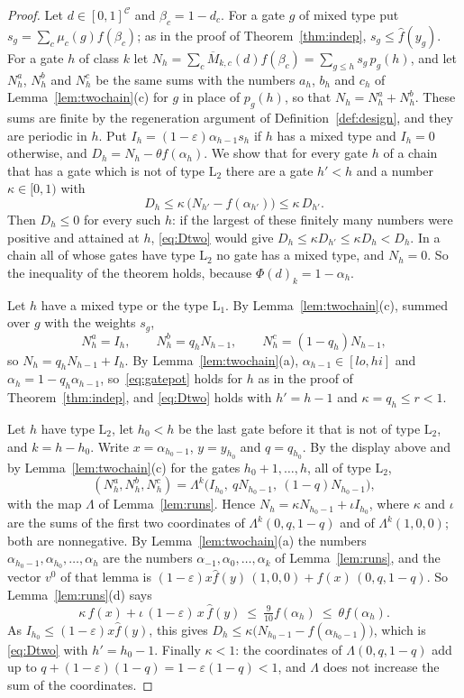 \documentclass[11pt]{amsart}
\theoremstyle{definition}
\theoremstyle{remark}
\newcommand{\eps}{\varepsilon}
\begin{document}
\begin{proof}
Let $d\in[0,1]^{\mathcal C}$ and $\beta_c=1-d_c$. For a gate $g$ of mixed type put
$s_g=\sum_c\mu_c(g)f(\beta_c)$; as in the proof of Theorem~\ref{thm:indep},
$s_g\le\hat f(y_g)$. For a gate $h$ of class $k$ let
$N_h=\sum_c\overline M_{k,c}(d)f(\beta_c)=\sum_{g\le h}s_g\,p_g(h)$, and let $N^a_h$, $N^b_h$
and $N^c_h$ be the same sums with the numbers $a_h$, $b_h$ and $c_h$ of
Lemma~\ref{lem:twochain}(c) for $g$ in place of $p_g(h)$, so that $N_h=N^a_h+N^b_h$. These sums
are finite by the regeneration argument of Definition~\ref{def:design}, and they are periodic in
$h$. Put $I_h=(1-\eps)\alpha_{h-1}s_h$ if $h$ has a mixed type and $I_h=0$ otherwise, and
$D_h=N_h-\theta f(\alpha_h)$. We show that for every gate $h$ of a chain that has a gate which
is not of type $\mathrm L_2$ there are a gate $h'<h$ and a number $\kappa\in[0,1)$ with
\begin{equation}\label{eq:Dtwo}
D_h\le\kappa\,\bigl(N_{h'}-f(\alpha_{h'})\bigr)\le\kappa\,D_{h'} .
\end{equation}
Then $D_h\le0$ for every such $h$: if the largest of these finitely many numbers were positive
and attained at $h$, \eqref{eq:Dtwo} would give $D_h\le\kappa D_{h'}\le\kappa D_h<D_h$. In a chain all of whose
gates have type $\mathrm L_2$ no gate has a mixed type, and $N_h=0$. So the inequality of the
theorem holds, because $\Phi(d)_k=1-\alpha_h$.

Let $h$ have a mixed type or the type $\mathrm L_1$. By Lemma~\ref{lem:twochain}(c), summed over
$g$ with the weights $s_g$,
\[
N^a_h=I_h,\qquad N^b_h=q_hN_{h-1},\qquad N^c_h=(1-q_h)N_{h-1} ,
\]
so $N_h=q_hN_{h-1}+I_h$. By Lemma~\ref{lem:twochain}(a), $\alpha_{h-1}\in[lo,hi]$ and
$\alpha_h=1-q_h\alpha_{h-1}$, so~\eqref{eq:gatepot} holds for $h$ as in the proof of
Theorem~\ref{thm:indep}, and \eqref{eq:Dtwo} holds with $h'=h-1$ and $\kappa=q_h\le r<1$.

Let $h$ have type $\mathrm L_2$, let $h_0<h$ be the last gate before it that is not of type
$\mathrm L_2$, and $k=h-h_0$. Write $x=\alpha_{h_0-1}$, $y=y_{h_0}$ and $q=q_{h_0}$. By the
display above and by Lemma~\ref{lem:twochain}(c) for the gates $h_0+1,\dots,h$, all of type
$\mathrm L_2$,
\[
(N^a_h,N^b_h,N^c_h)=\Lambda^k\bigl(I_{h_0},\ qN_{h_0-1},\ (1-q)N_{h_0-1}\bigr),
\]
with the map $\Lambda$ of Lemma~\ref{lem:runs}. Hence $N_h=\kappa N_{h_0-1}+\iota I_{h_0}$, where
$\kappa$ and $\iota$ are the sums of the first two coordinates of $\Lambda^k(0,q,1-q)$ and of
$\Lambda^k(1,0,0)$; both are nonnegative. By Lemma~\ref{lem:twochain}(a) the numbers
$\alpha_{h_0-1},\alpha_{h_0},\dots,\alpha_h$ are the numbers $\alpha_{-1},\alpha_0,\dots,\alpha_k$
of Lemma~\ref{lem:runs}, and the vector $v^0$ of that lemma is
$(1-\eps)x\hat f(y)\,(1,0,0)+f(x)\,(0,q,1-q)$. So Lemma~\ref{lem:runs}(d) says
\[
\kappa\,f(x)+\iota\,(1-\eps)\,x\,\hat f(y)\ \le\ \tfrac9{10}f(\alpha_h)\ \le\ \theta f(\alpha_h).
\]
As $I_{h_0}\le(1-\eps)x\hat f(y)$, this gives
$D_h\le\kappa\bigl(N_{h_0-1}-f(\alpha_{h_0-1})\bigr)$, which is \eqref{eq:Dtwo} with
$h'=h_0-1$. Finally $\kappa<1$: the coordinates of $\Lambda(0,q,1-q)$ add up to
$q+(1-\eps)(1-q)=1-\eps(1-q)<1$, and $\Lambda$ does not increase the sum of the coordinates.


\end{proof}
\end{document}
